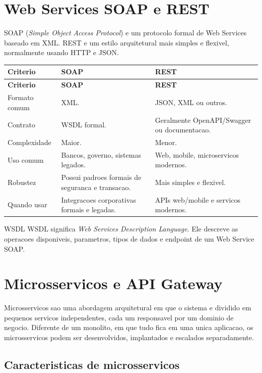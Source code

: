 \documentclass[12pt,a4paper]{article}
\begin{document}
\section{Web Services SOAP e REST}

SOAP (\textit{Simple Object Access Protocol}) e um protocolo formal de Web Services baseado em XML. REST e um estilo arquitetural mais simples e flexivel, normalmente usando HTTP e JSON.

\begin{longtable}{@{}L{3cm}L{5.7cm}L{5.7cm}@{}}
\toprule
\textbf{Criterio} & \textbf{SOAP} & \textbf{REST} \\
\midrule
\endfirsthead
\toprule
\textbf{Criterio} & \textbf{SOAP} & \textbf{REST} \\
\midrule
\endhead
Formato comum & XML. & JSON, XML ou outros. \\
Contrato & WSDL formal. & Geralmente OpenAPI/Swagger ou documentacao. \\
Complexidade & Maior. & Menor. \\
Uso comum & Bancos, governo, sistemas legados. & Web, mobile, microservicos modernos. \\
Robustez & Possui padroes formais de seguranca e transacao. & Mais simples e flexivel. \\
Quando usar & Integracoes corporativas formais e legadas. & APIs web/mobile e servicos modernos. \\
\bottomrule
\end{longtable}

\begin{observacao}{WSDL}
WSDL significa \textit{Web Services Description Language}. Ele descreve as operacoes disponiveis, parametros, tipos de dados e endpoint de um Web Service SOAP.
\end{observacao}

\section{Microsservicos e API Gateway}

Microsservicos sao uma abordagem arquitetural em que o sistema e dividido em pequenos servicos independentes, cada um responsavel por um dominio de negocio. Diferente de um monolito, em que tudo fica em uma unica aplicacao, os microsservicos podem ser desenvolvidos, implantados e escalados separadamente.

\subsection{Caracteristicas de microsservicos}
\end{document}
